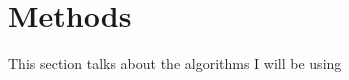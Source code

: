 \documentclass[../main.tex]{subfiles}
\begin{document}
\section{Methods}
    This section talks about the algorithms I will be using
\end{document}
